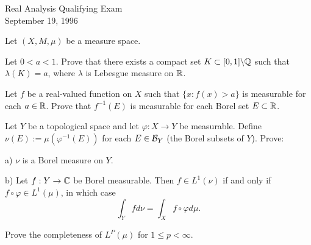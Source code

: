 \documentclass[bbb]{report}
\begin{document}

\begin{Large}

\begin{center}
   Real Analysis Qualifying Exam \\
   September 19, 1996 \\
\end{center}

\vspace{.1in}

\begin{description}

\item[] Let $(X,M,\mu)$ be a measure space.

\vspace{.1in}

\item[1.] Let $0<a<1$. Prove that there exists a compact set
$K\subset[0,1]\backslash {\Bbb Q}$ such that $\lambda(K)=a$, 
where $\lambda$ is
Lebesgue measure on ${\Bbb R}$.

\vspace{.35in}

\item[2.] Let $f$ be a real-valued function on $X$ such that
$\{x:f(x)>a\}$ is measurable for each $a\in{\Bbb R}$. Prove that 
$f^{-1}(E)$ is measurable for each Borel set $E\subset{\Bbb R}$.

\vspace{.35in}

\item[3.] Let $Y$ be a topological space and let 
$\varphi:X\to Y$ be measurable. Define 
$\nu(E):=\mu(\varphi^{-1}(E))$ for each $E\in{\cal B}_Y$ 
(the Borel subsets of $Y$). Prove:

\vspace{-.35in}

\item\item[\quad] a) $\nu$ is a Borel measure on $Y$.
\item\item[\quad] b) Let $f:Y\to {\Bbb C}$ be Borel measurable. Then
$f\in L^1(\nu)$ if and only if $f\circ\varphi\in L^1(\mu)$, in which
case
$$ \int_{Y}fd\nu=\int_Xf\circ\varphi d\mu. $$

\vspace{.35in}

\item[4.]  Prove the completeness of 
$L^P(\mu)$ for $1\leq p<\infty$.


\end{description}
\end{Large}
\end{document}
